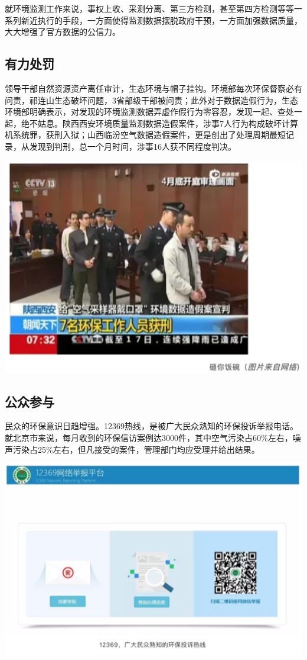 \documentclass[]{book}
\begin{document}
就环境监测工作来说，事权上收、采测分离、第三方检测，甚至第四方检测等等一系列新近执行的手段，一方面使得监测数据摆脱政府干预，一方面加强数据质量，大大增强了官方数据的公信力。

\hypertarget{ux6709ux529bux5904ux7f5a}{%
\subsection{有力处罚}\label{ux6709ux529bux5904ux7f5a}}

领导干部自然资源资产离任审计，生态环境与帽子挂钩。环境部每次环保督察必有问责，祁连山生态破坏问题，3省部级干部被问责；此外对于数据造假行为，生态环境部明确表示，对发现的环境监测数据弄虚作假行为零容忍，发现一起、查处一起，绝不姑息。陕西西安环境质量监测数据造假案件，涉事7人行为构成破坏计算机系统罪，获刑入狱；山西临汾空气数据造假案件，更是创出了处理周期最短记录，从发现到判刑，总一个月时间，涉事16人获不同程度判决。

\includegraphics[width=6.67in]{images/fw4}

\hypertarget{ux516cux4f17ux53c2ux4e0e}{%
\subsection{公众参与}\label{ux516cux4f17ux53c2ux4e0e}}

民众的环保意识日趋增强。12369热线，是被广大民众熟知的环保投诉举报电话。就北京市来说，每月收到的环保信访案例达3000件，其中空气污染占60\%左右，噪声污染占25\%左右，但凡接受的案件，管理部门均应受理并给出结果。

\includegraphics[width=6.67in]{images/fw5}
\end{document}
